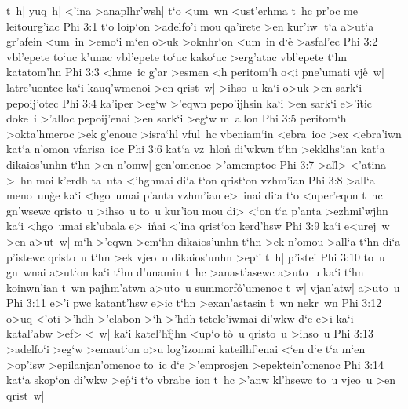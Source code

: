 t~h|
yuq~h|
<'ina
>anaplhr'wsh|
t`o
<um~wn
<ust'erhma
t~hc
pr'oc
me
leitourg'iac\bibvsend
\vs Phi 3:1
t`o
loip`on
>adelfo'i
mou
qa'irete
>en
kur'iw|
t`a
a>ut`a
gr'afein
<um~in
>emo`i
m`en
o>uk
>oknhr`on
<um~in
d`e\r{}
>asfal'ec\bibvsend
\vs Phi 3:2
vbl'epete
to`uc
k'unac
vbl'epete
to`uc
kako`uc
>erg'atac
vbl'epete
t`hn
katatom'hn\bibvsend
\vs Phi 3:3
<hme~ic
g'ar
>esmen
<h
peritom`h
o<i
pne'umati
vj\r{e}~w|
latre'uontec
ka`i
kauq'wmenoi
>en
qrist~w|
>ihso~u
ka`i
o>uk
>en
sark`i
pepoij'otec\bibvsend
\vs Phi 3:4
ka'iper
>eg`w
>'eqwn
pepo'ijhsin
ka`i
>en
sark`i
e>'i\r{t}ic
doke~i
>'alloc
pepoij'enai
>en
sark`i
>eg`w
m~allon\bibvsend
\vs Phi 3:5
peritom`h
>okta'hmeroc
>ek
g'enouc
>isra`hl
vful~hc
vbeniam`in
<ebra~ioc
>ex
<ebra'iwn
kat`a
n'omon
vfarisa~ioc\bibvsend
\vs Phi 3:6
kat`a
vz~hlo\r{n}
di'wkwn
t`hn
>ekklhs'ian
kat`a
dikaios'unhn
t`hn
>en
n'omw|
gen'omenoc
>'amemptoc\bibvsend
\vs Phi 3:7
>al\r{l}>
<'atina
>~hn
moi
k'erdh
ta~uta
<'hghmai
di`a
t`on
qrist`on
vzhm'ian\bibvsend
\vs Phi 3:8
>all`a
meno~un\r{g}e
ka`i
<hgo~umai
p'anta
vzhm'ian
e>~inai
di`a
t`o
<uper'eqon
t~hc
gn'wsewc
qristo~u
>ihso~u
to~u
kur'iou
mou
di>
<`on
t`a
p'anta
>ezhmi'wjhn
ka`i
<hgo~umai
sk'ubala
e>~i\r{n}ai
<'ina
qrist`on
kerd'hsw\bibvsend
\vs Phi 3:9
ka`i
e<urej~w
>en
a>ut~w|
m`h
>'eqwn
>em`hn
dikaios'unhn
t`hn
>ek
n'omou
>all`a
t`hn
di`a
p'istewc
qristo~u
t`hn
>ek
vjeo~u
dikaios'unhn
>ep`i
t~h|
p'istei\bibvsend
\vs Phi 3:10
to~u
gn~wnai
a>ut`on
ka`i
t`hn
d'unamin
t~hc
>anast'asewc
a>uto~u
ka`i
t`hn
koinwn'ian
t~wn
pajhm'atwn
a>uto~u
summorf\r{o}'umenoc
t~w|
vjan'atw|
a>uto~u\bibvsend
\vs Phi 3:11
e>'i
pwc
katant'hsw
e>ic
t`hn
>exan'astasin
\r{t}~wn
nekr~wn\bibvsend
\vs Phi 3:12
o>uq
<'oti
>'hdh
>'elabon
>`h
>'hdh
tetele'iwmai
di'wkw
d`e
e>i
ka`i
katal'abw
>ef>
<~w|
ka`i
katel'h\r{f}jhn
<up`o
t\r{o}~u
qristo~u
>ihso~u\bibvsend
\vs Phi 3:13
>adelfo`i
>eg`w
>emaut`on
o>u
log'izomai
kateilhf'enai
<`en
d`e
t`a
m`en
>op'isw
>epilanjan'omenoc
to~ic
d`e
>'emprosjen
>epektein'omenoc\bibvsend
\vs Phi 3:14
kat`a
skop`on
di'wkw
>e\r{p}`i
t`o
vbrabe~ion
t~hc
>'anw
kl'hsewc
to~u
vjeo~u
>en
qrist~w|

